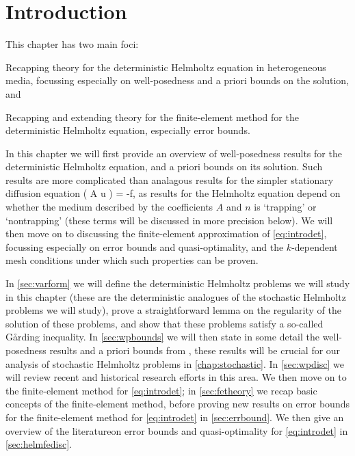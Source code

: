 \section{Introduction}
This chapter has two main foci:
\ben
\item Recapping theory for the deterministic Helmholtz equation in heterogeneous media, focussing especially on well-posedness and a priori bounds on the solution, and
\item Recapping and extending theory for the finite-element method for the deterministic Helmholtz equation, especially error bounds.
  \een

  In this chapter we will first provide an overview of well-posedness results for the deterministic Helmholtz equation, and a priori bounds on its solution. Such results are more complicated than analagous results for the simpler stationary diffusion equation
  \beq\label{eq:stdiff}
\grad \cdot \mleft( A \grad u \mright) = -f,
\eeq
as results for the Helmholtz equation depend on whether the medium described by the coefficients $A$ and $n$ is `trapping' or `nontrapping' (these terms will be discussed in more precision below). We will then move on to discussing the finite-element approximation of \eqref{eq:introdet}, focussing especially on error bounds and quasi-optimality, and the $k$-dependent mesh conditions under which such properties can be proven.

In \cref{sec:varform} we will define the deterministic Helmholtz problems we will study in this chapter (these are the deterministic analogues of the stochastic Helmholtz problems we will study), prove a straightforward lemma on the regularity of the solution of these problems, and show that these problems satisfy a so-called G\r{a}rding inequality. In \cref{sec:wpbounds} we will then state in some detail the well-posedness results and a priori bounds from \cite{GrPeSp:19}, these results will be crucial for our analysis of stochastic Helmholtz problems in \cref{chap:stochastic}. In \cref{sec:wpdisc} we will review recent and historical research efforts in this area. We then move on to the finite-element method for \eqref{eq:introdet}; in \cref{sec:fetheory} we recap basic concepts of the finite-element method, before proving new results on error bounds for the finite-element method for \eqref{eq:introdet} in \cref{sec:errbound}. We then give an overview of the literatureon error bounds and quasi-optimality for \eqref{eq:introdet} in \cref{sec:helmfedisc}.


